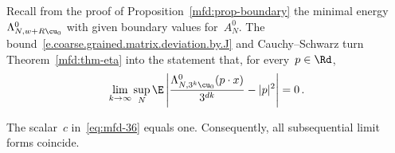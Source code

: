 \documentclass[11pt]{amsart}
\begin{document}
Recall from the proof of Proposition~\ref{mfd:prop-boundary} the minimal energy~$\Lambda^0_{N,w+R\cu_0}$ with given boundary values for~$A_N^0$. The bound~\eqref{e.coarse.grained.matrix.deviation.by.J} and Cauchy--Schwarz turn Theorem~\ref{mfd:thm-eta} into the statement that, for every~$p\in\Rd$,
\begin{equation}
	\lim_{k\to\infty}\sup_N\E\left|
	\frac{\Lambda^0_{N,3^k\cu_0}(p\cdot x)}{3^{dk}}-|p|^2\right|=0
	\,.
	\label{eq:mfd-37}
\end{equation}

\begin{theorem}
\label{mfd:thm-c1}
The scalar~$c$ in~\eqref{eq:mfd-36} equals one. Consequently, all subsequential limit forms coincide.
\end{theorem}
\end{document}
